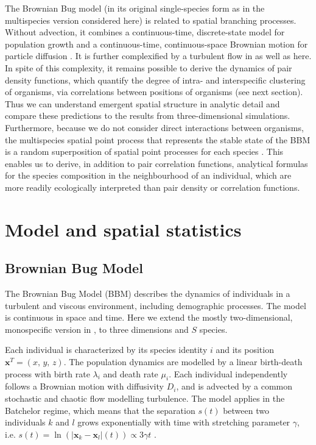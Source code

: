 \documentclass[12pt,english]{article}
\newcommand{\bx}{\boldsymbol{x}}
\begin{document}
The Brownian Bug model (in its original single-species form as in
the multispecies version considered here) is related to spatial branching
processes. Without advection, it combines a continuous-time, discrete-state
model for population growth and a continuous-time, continuous-space
Brownian motion for particle diffusion \citep{birch_master_2006}.
It is further complexified by a turbulent flow in \citet{young_reproductive_2001,picoche_rescience_2022}
as well as here. In spite of this complexity, it remains possible
to derive the dynamics of pair density functions, which quantify the
degree of intra- and interspecific clustering of organisms, via correlations
between positions of organisms (see next section). Thus we can understand
emergent spatial structure in analytic detail and compare these predictions
to the results from three-dimensional simulations. Furthermore, because
we do not consider direct interactions between organisms, the multispecies
spatial point process that represents the stable state of the BBM
is a random superposition of spatial point processes for each species
\citep{illian2008statistical}. This enables us to derive, in addition
to pair correlation functions, analytical formulas for the species
composition in the neighbourhood of an individual, which are more
readily ecologically interpreted than pair density or correlation
functions.

\section*{Model and spatial statistics}

\subsection*{Brownian Bug Model}

The Brownian Bug Model (BBM) describes the dynamics of individuals
in a turbulent and viscous environment, including demographic processes.
The model is continuous in space and time. Here we extend the mostly
two-dimensional, monospecific version in \citet{young_reproductive_2001},
to three dimensions and $S$ species.

Each individual is characterized by its species identity $i$ and
its position $\mathbf{x}^{T}=(x,\,y,\,z)$. The population dynamics
are modelled by a linear birth-death process with birth rate $\lambda_{i}$
and death rate $\mu_{i}$. Each individual independently follows a
Brownian motion with diffusivity $D_{i}$, and is advected by a common
stochastic and chaotic flow modelling turbulence. The model applies
in the Batchelor regime, which means that the separation $s(t)$ between
two individuals $k$ and $l$ grows exponentially with time with stretching
parameter $\gamma$, i.e. $s(t)=\ln\left(|\bx_{k}-\bx_{l}|(t)\right)\propto3\gamma t$
\citep{kraichnan_convection_1974,young_reproductive_2001}.
\end{document}
